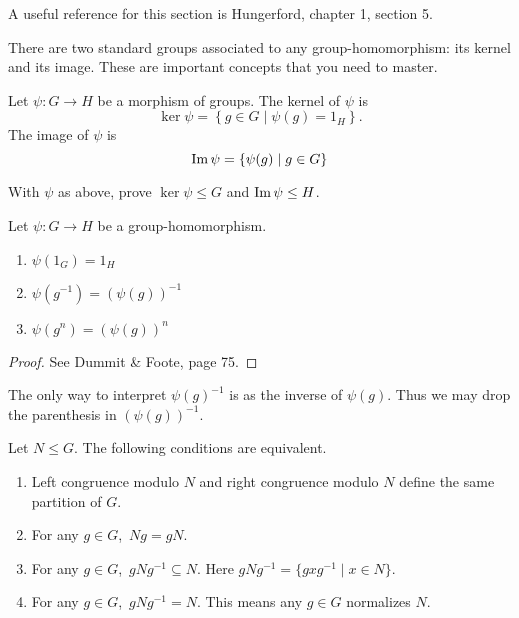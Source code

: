 \documentclass[11pt,a4paper]{article}
\begin{document}
A useful reference for this section is Hungerford, chapter 1, section 5.

There are two standard groups associated to any group-homomorphism: its kernel and its image.
These are important concepts that you need to master.

\begin{defi}
    Let  \(\psi \colon G\to H\) be a morphism of groups.
    The kernel of \(\psi\) is 
    \[\ker \psi =\left\{ g\in G \mid \psi(g) = 1_H \right\}.\]
    The image of \(\psi\) is 
    \[\operatorname{Im}\psi = \left\{ \psi(g) \mid g\in G \right\}\]
\end{defi}

\begin{eje}[Classwork]
    With \(\psi\) as above, prove \(\ker\psi \leq G\) and \(\operatorname{Im} \psi \leq H \).
\end{eje}

\begin{prop}
    Let \(\psi\colon G\to H\) be a group-homomorphism.
    \begin{enumerate}[label=(\roman*)]
        \item \(\psi(1_G) = 1_H\)
        \item \(\psi(g^{-1}) = (\psi(g))^{-1}\)
        \item \(\psi(g^n) = (\psi(g))^n\)
    \end{enumerate}
\end{prop}

\begin{proof}
    See Dummit \& Foote, page 75.
\end{proof}

The only way to interpret \(\psi(g)^{-1}\) is as the inverse of \(\psi(g)\).
Thus we may drop the parenthesis in \((\psi(g))^{-1}\).


\begin{teo}\label{equivalent.conditions.normality}
Let \(N\leq G\).
The following conditions are equivalent.
\begin{enumerate}[label=(\roman*)]
\item Left congruence modulo \(N\) and right congruence modulo \(N\) define the same partition of \(G\).
\item For any \(g\in G\),\, \(Ng = gN\).
\item For any \(g\in G\),\, \(gNg^{-1}\subseteq N\). Here \(gNg^{-1} =\{  gxg^{-1} \mid x\in N\}\).
\item For any \(g\in G\),\, \(gNg^{-1} = N\). This means any \(g\in G\) normalizes \(N\).
\end{enumerate}
\end{teo}
\end{document}
